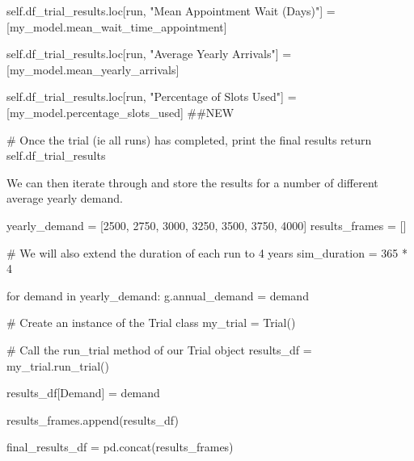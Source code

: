 \documentclass[
  letterpaper,
  DIV=11,
  numbers=noendperiod]{scrreprt}
\newenvironment{Shaded}{}{}
\newcommand{\CommentTok}[1]{\textcolor[rgb]{0.42,0.45,0.49}{#1}}
\newcommand{\ControlFlowTok}[1]{\textcolor[rgb]{0.84,0.23,0.29}{#1}}
\newcommand{\DecValTok}[1]{\textcolor[rgb]{0.00,0.36,0.77}{#1}}
\newcommand{\KeywordTok}[1]{\textcolor[rgb]{0.84,0.23,0.29}{#1}}
\newcommand{\NormalTok}[1]{\textcolor[rgb]{0.14,0.16,0.18}{#1}}
\newcommand{\OperatorTok}[1]{\textcolor[rgb]{0.14,0.16,0.18}{#1}}
\newcommand{\StringTok}[1]{\textcolor[rgb]{0.01,0.18,0.38}{#1}}
\newcommand{\VariableTok}[1]{\textcolor[rgb]{0.89,0.38,0.04}{#1}}
\begin{document}
\begin{Shaded}
\begin{Highlighting}[]
            \VariableTok{self}\NormalTok{.df\_trial\_results.loc[run, }\StringTok{"Mean Appointment Wait (Days)"}\NormalTok{] }\OperatorTok{=}\NormalTok{ [my\_model.mean\_wait\_time\_appointment]}

            \VariableTok{self}\NormalTok{.df\_trial\_results.loc[run, }\StringTok{"Average Yearly Arrivals"}\NormalTok{] }\OperatorTok{=}\NormalTok{ [my\_model.mean\_yearly\_arrivals]}

            \VariableTok{self}\NormalTok{.df\_trial\_results.loc[run, }\StringTok{"Percentage of Slots Used"}\NormalTok{] }\OperatorTok{=}\NormalTok{ [my\_model.percentage\_slots\_used] }\CommentTok{\#\#NEW}

        \CommentTok{\# Once the trial (ie all runs) has completed, print the final results}
        \ControlFlowTok{return} \VariableTok{self}\NormalTok{.df\_trial\_results}
\end{Highlighting}
\end{Shaded}

We can then iterate through and store the results for a number of
different average yearly demand.

\begin{Shaded}
\begin{Highlighting}[]
\NormalTok{yearly\_demand }\OperatorTok{=}\NormalTok{ [}\DecValTok{2500}\NormalTok{, }\DecValTok{2750}\NormalTok{, }\DecValTok{3000}\NormalTok{, }\DecValTok{3250}\NormalTok{, }\DecValTok{3500}\NormalTok{, }\DecValTok{3750}\NormalTok{, }\DecValTok{4000}\NormalTok{]}
\NormalTok{results\_frames }\OperatorTok{=}\NormalTok{ []}

\CommentTok{\# We will also extend the duration of each run to 4 years}
\NormalTok{sim\_duration }\OperatorTok{=} \DecValTok{365} \OperatorTok{*} \DecValTok{4}

\ControlFlowTok{for}\NormalTok{ demand }\KeywordTok{in}\NormalTok{ yearly\_demand:}
\NormalTok{    g.annual\_demand }\OperatorTok{=}\NormalTok{ demand}

    \CommentTok{\# Create an instance of the Trial class}
\NormalTok{    my\_trial }\OperatorTok{=}\NormalTok{ Trial()}

    \CommentTok{\# Call the run\_trial method of our Trial object}
\NormalTok{    results\_df }\OperatorTok{=}\NormalTok{ my\_trial.run\_trial()}

\NormalTok{    results\_df[}\StringTok{\textquotesingle{}Demand\textquotesingle{}}\NormalTok{] }\OperatorTok{=}\NormalTok{ demand}

\NormalTok{    results\_frames.append(results\_df)}

\NormalTok{final\_results\_df }\OperatorTok{=}\NormalTok{ pd.concat(results\_frames)}
\end{Highlighting}
\end{Shaded}
\end{document}
